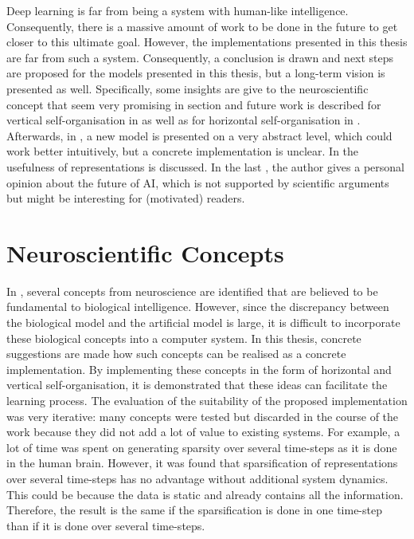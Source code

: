 
Deep learning is far from being a system with human-like intelligence. Consequently, there is a massive amount of work to be done in the future to get closer to this ultimate goal. However, the implementations presented in this thesis are far from such a system. Consequently, a conclusion is drawn and next steps are proposed for the models presented in this thesis, but a long-term vision is presented as well. Specifically, some insights are give to the neuroscientific concept that seem very promising in section  and future work is described for vertical self-organisation in  as well as for horizontal self-organisation in . Afterwards, in , a new model is presented on a very abstract level, which could work better intuitively, but a concrete implementation is unclear. In  the usefulness of representations is discussed. In the last , the author gives a personal opinion about the future of AI, which is not supported by scientific arguments but might be interesting for (motivated) readers.



\section{Neuroscientific Concepts}
In , several concepts from neuroscience are identified that are believed to be fundamental to biological intelligence. However, since the discrepancy between the biological model and the artificial model is large, it is difficult to incorporate these biological concepts into a computer system. In this thesis, concrete suggestions are made how such concepts can be realised as a concrete implementation. By implementing these concepts in the form of horizontal and vertical self-organisation, it is demonstrated that these ideas can facilitate the learning process. The evaluation of the suitability of the proposed implementation was very iterative: many concepts were tested but discarded in the course of the work because they did not add a lot of value to existing systems. For example, a lot of time was spent on generating sparsity over several time-steps as it is done in the human brain. However, it was found that sparsification of representations over several time-steps has no advantage without additional system dynamics. This could be because the data is static and already contains all the information. Therefore, the result is the same if the sparsification is done in one time-step than if it is done over several time-steps.

